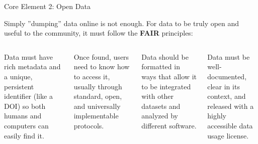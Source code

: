 \documentclass[aspectratio=169]{beamer}
\begin{document}
\begin{frame}{Core Element 2: Open Data}
  \vspace{.5em}
  
  Simply ''dumping'' data online is not enough. For data to be truly open and useful to the community, it must follow the \textbf{FAIR} principles:
  \vspace{-.5em}
  \begin{columns}[T,onlytextwidth]
      \begin{cookiecard}[title=F - Findable]
        Data must have rich metadata and a unique, persistent identifier (like a DOI) so both humans and computers can easily find it.
      \end{cookiecard}
      
      \vspace{0.1em}
      \begin{cookiecard}[title=A - Accessible]
        Once found, users need to know how to access it, usually through standard, open, and universally implementable protocols.
      \end{cookiecard}

      \begin{cookiecard}[title=I - Interoperable]
        Data should be formatted in ways that allow it to be integrated with other datasets and analyzed by different software.
      \end{cookiecard}
      
      \vspace{0.1em}
      \begin{cookiecard}[title=R - Reusable]
        Data must be well-documented, clear in its context, and released with a highly accessible data usage license.
      \end{cookiecard}
  \end{columns}
\end{frame}
\end{document}
